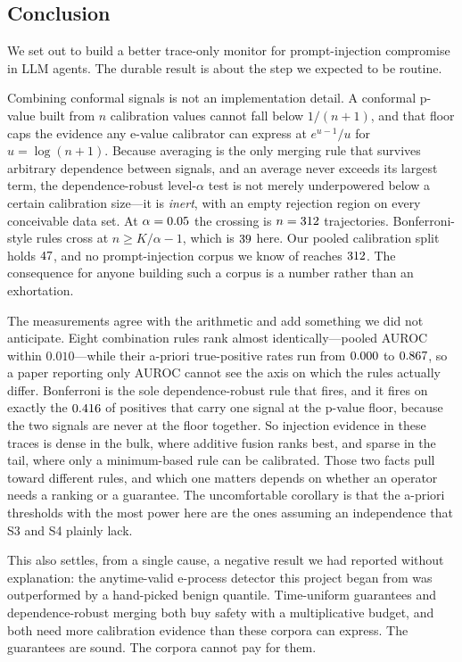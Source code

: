 \documentclass[preprint,12pt,authoryear]{elsarticle}
\theoremstyle{definition}
\begin{document}
\subsection{Conclusion}\label{sec:conclusion}

We set out to build a better trace-only monitor for prompt-injection compromise in
LLM agents. The durable result is about the step we expected to be routine.

Combining conformal signals is not an implementation detail. A conformal p-value
built from $n$ calibration values cannot fall below $1/(n{+}1)$, and that floor caps
the evidence any e-value calibrator can express at $e^{u-1}/u$ for $u =
\log(n{+}1)$. Because averaging is the only merging rule that survives arbitrary
dependence between signals, and an average never exceeds its largest term, the
dependence-robust level-$\alpha$ test is not merely underpowered below a certain
calibration size---it is \emph{inert}, with an empty rejection region on every
conceivable data set. At $\alpha = 0.05$ the crossing is $n = 312$
trajectories. Bonferroni-style rules cross at $n \ge K/\alpha - 1$, which is
$39$ here. Our pooled calibration split holds $47$, and no
prompt-injection corpus we know of reaches $312$. The consequence for anyone
building such a corpus is a number rather than an exhortation.

The measurements agree with the arithmetic and add something we did not anticipate.
Eight combination rules rank almost identically---pooled AUROC within $0.010$---while
their a-priori true-positive rates run from $0.000$ to
$0.867$, so a paper reporting only AUROC cannot see the axis on which
the rules actually differ. Bonferroni is the sole dependence-robust rule that
fires, and it fires on exactly the $0.416$ of positives that carry one signal at
the p-value floor, because the two signals are never at the floor together. So
injection evidence in these traces is dense in the bulk, where additive fusion
ranks best, and sparse in the tail, where only a minimum-based rule can be
calibrated. Those two facts pull toward different rules, and which one matters
depends on whether an operator needs a ranking or a guarantee. The uncomfortable
corollary is that the a-priori thresholds with the most power here are the ones
assuming an independence that S3 and S4 plainly lack.

This also settles, from a single cause, a negative result we had reported without
explanation: the anytime-valid e-process detector this project began from was
outperformed by a hand-picked benign quantile. Time-uniform guarantees and
dependence-robust merging both buy safety with a multiplicative budget, and both
need more calibration evidence than these corpora can express. The guarantees are
sound. The corpora cannot pay for them.
\end{document}

